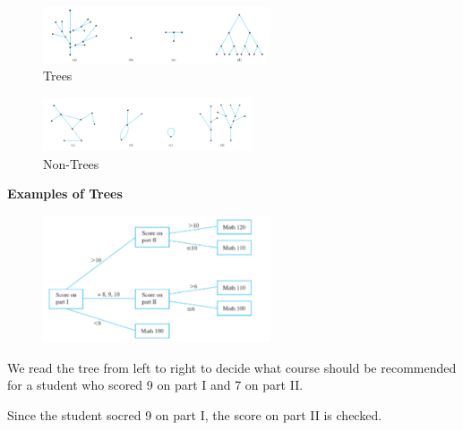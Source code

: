 \documentclass{report}
\begin{document}
\bigbreak \noindent 
\begin{figure}[ht]
\centering
\includegraphics[width=0.6\textwidth]{ figure15.png }
\caption{Trees}
\end{figure}
\bigbreak 
\begin{figure}[ht]
\centering
\includegraphics[width=0.55\textwidth]{ figure16.png }
\caption{Non-Trees}
\end{figure}
\pagebreak

\noindent \begin{LARGE}
	\textbf{Examples of Trees}
\end{LARGE}
\bigbreak \noindent \bigbreak \noindent
{}
\begin{figure}[ht]
\centering
\includegraphics[width=0.6\textwidth]{ figure17.png }
\caption{}
\end{figure}
\bigbreak \noindent
We read the tree from left to right to decide what course should be recommended for a student who scored 9 on part I and 7 on part II.
\vspace{5mm}

Since the student socred 9 on part I, the score on part II is checked.
\vspace{4mm}
\end{document}
